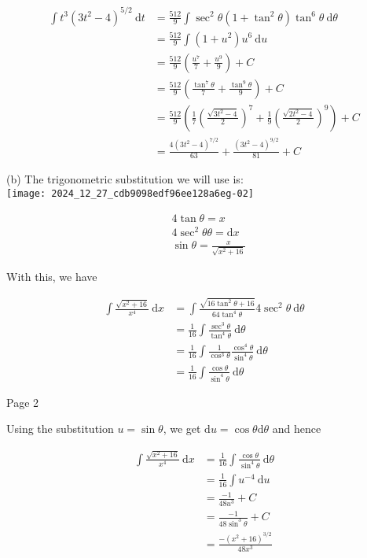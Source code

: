 \documentclass[10pt]{article}
\begin{document}
$$
\begin{aligned}
\int t^{3}\left(3 t^{2}-4\right)^{5 / 2} \mathrm{~d} t & =\frac{512}{9} \int \sec ^{2} \theta\left(1+\tan ^{2} \theta\right) \tan ^{6} \theta \mathrm{~d} \theta \\
& =\frac{512}{9} \int\left(1+u^{2}\right) u^{6} \mathrm{~d} u \\
& =\frac{512}{9}\left(\frac{u^{7}}{7}+\frac{u^{9}}{9}\right)+C \\
& =\frac{512}{9}\left(\frac{\tan ^{7} \theta}{7}+\frac{\tan ^{9} \theta}{9}\right)+C \\
& =\frac{512}{9}\left(\frac{1}{7}\left(\frac{\sqrt{3 t^{2}-4}}{2}\right)^{7}+\frac{1}{9}\left(\frac{\sqrt{2 t^{2}-4}}{2}\right)^{9}\right)+C \\
& =\frac{4\left(3 t^{2}-4\right)^{7 / 2}}{63}+\frac{\left(3 t^{2}-4\right)^{9 / 2}}{81}+C
\end{aligned}
$$

(b) The trigonometric substitution we will use is:\\
\texttt{[image: 2024\_12\_27\_cdb9098edf96ee128a6eg-02]}

$$
\begin{aligned}
& 4 \tan \theta=x \\
& 4 \sec ^{2} \theta \theta=\mathrm{d} x \\
& \sin \theta=\frac{x}{\sqrt{x^{2}+16}}
\end{aligned}
$$

With this, we have

$$
\begin{aligned}
\int \frac{\sqrt{x^{2}+16}}{x^{4}} \mathrm{~d} x & =\int \frac{\sqrt{16 \tan ^{2} \theta+16}}{64 \tan ^{4} \theta} 4 \sec ^{2} \theta \mathrm{~d} \theta \\
& =\frac{1}{16} \int \frac{\sec ^{3} \theta}{\tan ^{4} \theta} \mathrm{~d} \theta \\
& =\frac{1}{16} \int \frac{1}{\cos ^{3} \theta} \frac{\cos ^{4} \theta}{\sin ^{4} \theta} \mathrm{~d} \theta \\
& =\frac{1}{16} \int \frac{\cos \theta}{\sin ^{4} \theta} \mathrm{~d} \theta
\end{aligned}
$$

Page 2

Using the substitution $u=\sin \theta$, we get $\mathrm{d} u=\cos \theta \mathrm{d} \theta$ and hence

$$
\begin{aligned}
\int \frac{\sqrt{x^{2}+16}}{x^{4}} \mathrm{~d} x & =\frac{1}{16} \int \frac{\cos \theta}{\sin ^{4} \theta} \mathrm{~d} \theta \\
& =\frac{1}{16} \int u^{-4} \mathrm{~d} u \\
& =\frac{-1}{48 u^{3}}+C \\
& =\frac{-1}{48 \sin ^{3} \theta}+C \\
& =\frac{-\left(x^{2}+16\right)^{3 / 2}}{48 x^{3}}
\end{aligned}
$$
\end{document}
